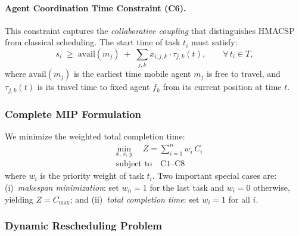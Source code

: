 \documentclass[manuscript,screen,review]{acmart}
\begin{document}
\paragraph{Agent Coordination Time Constraint (C6).}
This constraint captures the \emph{collaborative coupling} that
distinguishes HMACSP from classical scheduling.
The start time of task $t_i$ must satisfy:
\begin{equation}
    s_i \;\geq\; \mathrm{avail}(m_j) \;+\; \sum_{j,k} x_{i,j,k}
    \cdot \tau_{j,k}(t),
    \qquad \forall\, t_i \in T,
    \label{eq:c6}
\end{equation}
where $\mathrm{avail}(m_j)$ is the earliest time mobile agent $m_j$
is free to travel, and $\tau_{j,k}(t)$ is its travel time to fixed
agent $f_k$ from its current position at time $t$.

\subsubsection{Complete MIP Formulation}

We minimize the weighted total completion time:
\begin{equation}
\boxed{
\begin{aligned}
    &\min_{x,\,s,\,y} \quad Z = \sum_{i=1}^{n} w_i\, C_i \\
    &\;\text{subject to} \quad \text{C1--C8}
\end{aligned}
}
\label{eq:mip}
\end{equation}
where $w_i$ is the priority weight of task $t_i$. Two important special
cases are: (i)~\textit{makespan minimization}: set $w_n = 1$ for the last
task and $w_i = 0$ otherwise, yielding $Z = C_{\max}$; and
(ii)~\textit{total completion time}: set $w_i = 1$ for all $i$.

\subsubsection{Dynamic Rescheduling Problem}
\end{document}
